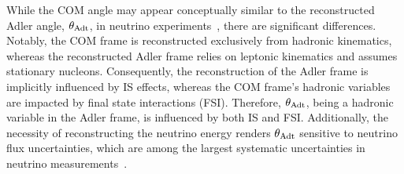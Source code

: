 While the COM angle may appear conceptually similar to the reconstructed Adler angle, $\theta_{\textrm{Adt}}$, in neutrino experiments~\cite{Sanchez:2015yvw}, there are significant differences. 
Notably, the COM frame is reconstructed exclusively from hadronic kinematics, whereas the reconstructed Adler frame relies on leptonic kinematics and assumes stationary nucleons. 
Consequently, the reconstruction of the Adler frame is implicitly influenced by IS effects, whereas the COM frame's hadronic variables are impacted by final state interactions (FSI). 
Therefore, $\theta_{\textrm{Adt}}$, being a hadronic variable in the Adler frame, is influenced by both IS and FSI. 
Additionally, the necessity of reconstructing the neutrino energy renders $\theta_{\textrm{Adt}}$ sensitive to neutrino flux uncertainties, which are among the largest systematic uncertainties in neutrino measurements~\cite{T2K:2019yqu,T2K:2021naz,MicroBooNECollaboration:2024gvg,NOvA:2023uxq,MINERvA:2022djk}.


